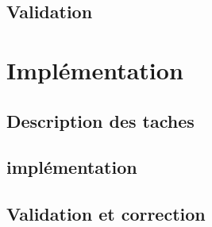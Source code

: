 	\subsection{Validation}
\section{Implémentation}
		\subsection{Description des taches}
		\subsection{implémentation}
		\subsection{Validation et correction}